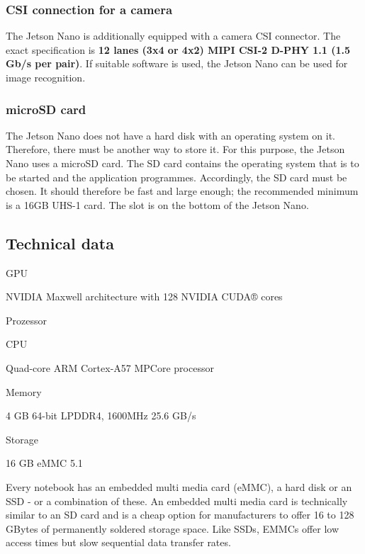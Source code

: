 \subsubsection{CSI connection for a camera}

The Jetson Nano is additionally equipped with a camera CSI connector. 
The exact specification is \textbf{12 lanes (3x4 or 4x2) MIPI CSI-2 D-PHY 1.1 (1.5 Gb/s per pair)}.
If suitable software is used, the Jetson Nano can be used for image recognition.

\subsubsection{microSD card}


The Jetson Nano does not have a hard disk with an operating system on it.
Therefore, there must be another way to store it. For this purpose, the Jetson Nano uses a microSD card. The SD card contains the operating system that is to be started and the application programmes. Accordingly, the SD card must be chosen. It should therefore be fast and large enough; the recommended minimum is a 16GB UHS-1 card. The slot is on the bottom of the Jetson Nano. 




\subsection{Technical data}



GPU

NVIDIA Maxwell architecture with 128 NVIDIA CUDA® cores


Prozessor

CPU

Quad-core ARM Cortex-A57 MPCore processor 


Memory


4 GB 64-bit LPDDR4, 1600MHz 25.6 GB/s 


Storage

16 GB eMMC 5.1 

Every notebook has an embedded multi media card (eMMC), a hard disk or an SSD - or a combination of these. An embedded multi media card is technically similar to an SD card and is a cheap option for manufacturers to offer 16 to 128 GBytes of permanently soldered storage space. Like SSDs, EMMCs offer low access times but slow sequential data transfer rates.



